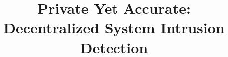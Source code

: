 \documentclass[conference]{./sty/IEEEtran-3}
\begin{document}
\title{Private Yet Accurate: Decentralized System Intrusion Detection}

\maketitle


% 
% 


% 


% 



% 


% 
% 

% 
% 
% 

\balance

{
\footnotesize
\setlength{\bibsep}{3pt}
}

\end{document}

